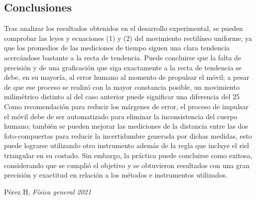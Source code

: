 \documentclass{article}
\begin{document}
\begin{multicols}{2}
\section*{Conclusiones}\label{Conclusiones}				%

Tras analizar los resultados obtenidos en el desarrollo experimental, se pueden comprobar las leyes y ecuaciones (1) y (2) del movimiento rectilíneo uniforme; ya que los promedios de las mediciones de tiempo siguen una clara tendencia acercándose bastante a la recta de tendencia. Puede concluirse que la falta de precisión y de una graficación que siga exactamente a la recta de tendencia se debe, en su mayoría, al error humano al momento de propulsar el móvil; a pesar de que ese proceso se realizó con la mayor constancia posible, un movimiento milimétrico distinto al del caso anterior puede significar una diferencia del 25%
Como recomendación para reducir los márgenes de error, el proceso de impulsar el móvil debe de ser automatizado para eliminar la inconsistencia del cuerpo humano; también se pueden mejorar las mediciones de la distancia entre las dos foto-compuertas para reducir la incertidumbre generada por dichas medidas, esto puede lograrse utilizando otro instrumento además de la regla que incluye el riel triangular en su costado.
Sin embargo, la práctica puede concluirse como exitosa, considerando que se cumplió el objetivo y se obtuvieron resultados con una gran precisión y exactitud en relación a los métodos e instrumentos utilizados.


\begin{thebibliography}{9}						%

%
	Pérez H, \emph{Física general 2021}
\end{thebibliography}


\end{multicols}
\end{document}
